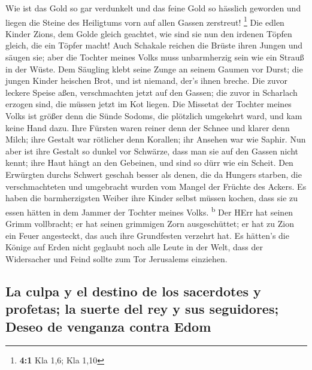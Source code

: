  Wie ist das Gold so gar verdunkelt und das feine Gold so
hässlich geworden und liegen die Steine des Heiligtums vorn auf allen
Gassen zerstreut! \footnote{\textbf{4:1} Kla 1,6; Kla 1,10}
 Die edlen Kinder Zions, dem Golde gleich geachtet, wie
sind sie nun den irdenen Töpfen gleich, die ein Töpfer macht!
 Auch Schakale reichen die Brüste ihren Jungen und säugen
sie; aber die Tochter meines Volks muss unbarmherzig sein wie ein Strauß
in der Wüste.  Dem Säugling klebt seine Zunge an seinem
Gaumen vor Durst; die jungen Kinder heischen Brot, und ist niemand,
der's ihnen breche.  Die zuvor leckere Speise aßen,
verschmachten jetzt auf den Gassen; die zuvor in Scharlach erzogen sind,
die müssen jetzt im Kot liegen.  Die Missetat der Tochter
meines Volks ist größer denn die Sünde Sodoms, die plötzlich umgekehrt
ward, und kam keine Hand dazu.  Ihre Fürsten waren reiner
denn der Schnee und klarer denn Milch; ihre Gestalt war rötlicher denn
Korallen; ihr Ansehen war wie Saphir.  Nun aber ist ihre
Gestalt so dunkel vor Schwärze, dass man sie auf den Gassen nicht kennt;
ihre Haut hängt an den Gebeinen, und sind so dürr wie ein Scheit.
 Den Erwürgten durchs Schwert geschah besser als denen,
die da Hungers starben, die verschmachteten und umgebracht wurden vom
Mangel der Früchte des Ackers.  Es haben die
barmherzigsten Weiber ihre Kinder selbst müssen kochen, dass sie zu
essen hätten in dem Jammer der Tochter meines Volks. \textsuperscript{b}
 Der HErr hat seinen Grimm vollbracht; er hat seinen
grimmigen Zorn ausgeschüttet; er hat zu Zion ein Feuer angesteckt, das
auch ihre Grundfesten verzehrt hat.  Es hätten's die
Könige auf Erden nicht geglaubt noch alle Leute in der Welt, dass der
Widersacher und Feind sollte zum Tor Jerusalems einziehen.

\hypertarget{la-culpa-y-el-destino-de-los-sacerdotes-y-profetas-la-suerte-del-rey-y-sus-seguidores-deseo-de-venganza-contra-edom}{%
\subsection{La culpa y el destino de los sacerdotes y profetas; la
suerte del rey y sus seguidores; Deseo de venganza contra
Edom}\label{la-culpa-y-el-destino-de-los-sacerdotes-y-profetas-la-suerte-del-rey-y-sus-seguidores-deseo-de-venganza-contra-edom}}

